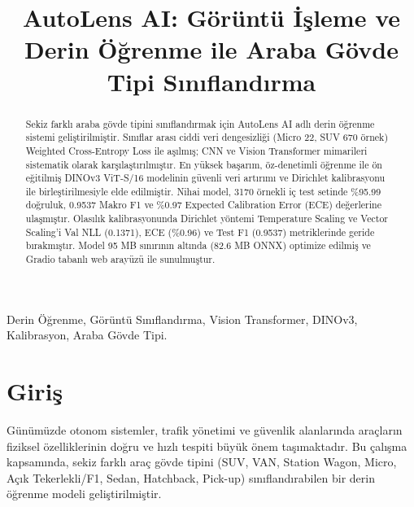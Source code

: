 \documentclass[conference]{IEEEtran}
\begin{document}
\shorthandoff{=}
\shorthandoff{:}

\title{AutoLens AI: Görüntü İşleme ve Derin Öğrenme ile Araba Gövde Tipi Sınıflandırma}

\author{
}

\maketitle

\begin{abstract}
Sekiz farklı araba gövde tipini sınıflandırmak için AutoLens AI adlı derin öğrenme sistemi geliştirilmiştir. Sınıflar arası ciddi veri dengesizliği (Micro 22, SUV 670 örnek) Weighted Cross-Entropy Loss ile aşılmış; CNN ve Vision Transformer mimarileri sistematik olarak karşılaştırılmıştır. En yüksek başarım, öz-denetimli öğrenme ile ön eğitilmiş DINOv3 ViT-S/16 modelinin güvenli veri artırımı ve Dirichlet kalibrasyonu ile birleştirilmesiyle elde edilmiştir. Nihai model, 3170 örnekli iç test setinde \%95.99 doğruluk, 0.9537 Makro F1 ve \%0.97 Expected Calibration Error (ECE) değerlerine ulaşmıştır. Olasılık kalibrasyonunda Dirichlet yöntemi Temperature Scaling ve Vector Scaling'i Val NLL (0.1371), ECE (\%0.96) ve Test F1 (0.9537) metriklerinde geride bırakmıştır. Model 95 MB sınırının altında (82.6 MB ONNX) optimize edilmiş ve Gradio tabanlı web arayüzü ile sunulmuştur.
\end{abstract}

\begin{IEEEkeywords}
Derin Öğrenme, Görüntü Sınıflandırma, Vision Transformer, DINOv3, Kalibrasyon, Araba Gövde Tipi.
\end{IEEEkeywords}

\section{Giriş}
Günümüzde otonom sistemler, trafik yönetimi ve güvenlik alanlarında araçların fiziksel özelliklerinin doğru ve hızlı tespiti büyük önem taşımaktadır. Bu çalışma kapsamında, sekiz farklı araç gövde tipini (SUV, VAN, Station Wagon, Micro, Açık Tekerlekli/F1, Sedan, Hatchback, Pick-up) sınıflandırabilen bir derin öğrenme modeli geliştirilmiştir.
\end{document}
